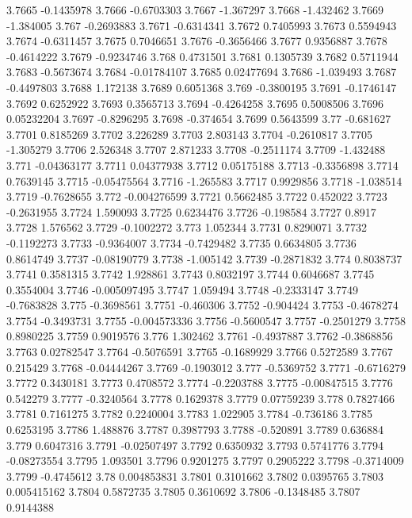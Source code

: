 3.7665  -0.1435978
3.7666  -0.6703303
3.7667  -1.367297
3.7668  -1.432462
3.7669  -1.384005
3.767  -0.2693883
3.7671  -0.6314341
3.7672  0.7405993
3.7673  0.5594943
3.7674  -0.6311457
3.7675  0.7046651
3.7676  -0.3656466
3.7677  0.9356887
3.7678  -0.4614222
3.7679  -0.9234746
3.768  0.4731501
3.7681  0.1305739
3.7682  0.5711944
3.7683  -0.5673674
3.7684  -0.01784107
3.7685  0.02477694
3.7686  -1.039493
3.7687  -0.4497803
3.7688  1.172138
3.7689  0.6051368
3.769  -0.3800195
3.7691  -0.1746147
3.7692  0.6252922
3.7693  0.3565713
3.7694  -0.4264258
3.7695  0.5008506
3.7696  0.05232204
3.7697  -0.8296295
3.7698  -0.374654
3.7699  0.5643599
3.77  -0.681627
3.7701  0.8185269
3.7702  3.226289
3.7703  2.803143
3.7704  -0.2610817
3.7705  -1.305279
3.7706  2.526348
3.7707  2.871233
3.7708  -0.2511174
3.7709  -1.432488
3.771  -0.04363177
3.7711  0.04377938
3.7712  0.05175188
3.7713  -0.3356898
3.7714  0.7639145
3.7715  -0.05475564
3.7716  -1.265583
3.7717  0.9929856
3.7718  -1.038514
3.7719  -0.7628655
3.772  -0.004276599
3.7721  0.5662485
3.7722  0.452022
3.7723  -0.2631955
3.7724  1.590093
3.7725  0.6234476
3.7726  -0.198584
3.7727  0.8917
3.7728  1.576562
3.7729  -0.1002272
3.773  1.052344
3.7731  0.8290071
3.7732  -0.1192273
3.7733  -0.9364007
3.7734  -0.7429482
3.7735  0.6634805
3.7736  0.8614749
3.7737  -0.08190779
3.7738  -1.005142
3.7739  -0.2871832
3.774  0.8038737
3.7741  0.3581315
3.7742  1.928861
3.7743  0.8032197
3.7744  0.6046687
3.7745  0.3554004
3.7746  -0.005097495
3.7747  1.059494
3.7748  -0.2333147
3.7749  -0.7683828
3.775  -0.3698561
3.7751  -0.460306
3.7752  -0.904424
3.7753  -0.4678274
3.7754  -0.3493731
3.7755  -0.004573336
3.7756  -0.5600547
3.7757  -0.2501279
3.7758  0.8980225
3.7759  0.9019576
3.776  1.302462
3.7761  -0.4937887
3.7762  -0.3868856
3.7763  0.02782547
3.7764  -0.5076591
3.7765  -0.1689929
3.7766  0.5272589
3.7767  0.215429
3.7768  -0.04444267
3.7769  -0.1903012
3.777  -0.5369752
3.7771  -0.6716279
3.7772  0.3430181
3.7773  0.4708572
3.7774  -0.2203788
3.7775  -0.00847515
3.7776  0.542279
3.7777  -0.3240564
3.7778  0.1629378
3.7779  0.07759239
3.778  0.7827466
3.7781  0.7161275
3.7782  0.2240004
3.7783  1.022905
3.7784  -0.736186
3.7785  0.6253195
3.7786  1.488876
3.7787  0.3987793
3.7788  -0.520891
3.7789  0.636884
3.779  0.6047316
3.7791  -0.02507497
3.7792  0.6350932
3.7793  0.5741776
3.7794  -0.08273554
3.7795  1.093501
3.7796  0.9201275
3.7797  0.2905222
3.7798  -0.3714009
3.7799  -0.4745612
3.78  0.004853831
3.7801  0.3101662
3.7802  0.0395765
3.7803  0.005415162
3.7804  0.5872735
3.7805  0.3610692
3.7806  -0.1348485
3.7807  0.9144388
